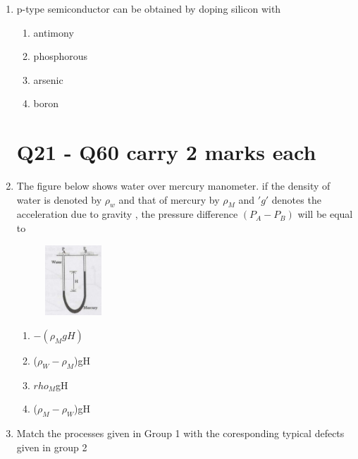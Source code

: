 \documentclass[journal]{IEEEtran}
\theoremstyle{remark}
\begin{document}
\begin{enumerate}
\item p-type semiconductor can be obtained by doping silicon with\hfill{}
\begin{multicols}{4}
\begin{enumerate}
\item antimony
\item phosphorous
\item arsenic
\item boron
\end{enumerate}
\end{multicols}

\section{Q21 - Q60 carry 2 marks each}
\item The figure below shows water over mercury manometer. if the density of water is denoted by $\rho_w$ and that of mercury by $\rho_M$ and $'g'$ denotes the acceleration due to gravity , the pressure difference $(P_A - P_B)$ will be equal to\hfill{}
\begin{figure}[H]
    \centering
    \includegraphics[width=0.2\textwidth]{figs/Q.21.png}
    \caption{}
    \label{fig:placeholder}
\end{figure}
\begin{multicols}{4}
\begin{enumerate}
    \item $-(\rho_M gH)$
    \item ($ \rho_W  -\rho_M$)gH
    \item  $rho_M$gH
    \item ($\rho_M-\rho_W$)gH
\end{enumerate}
\end{multicols}
\item Match the processes given in Group 1 with the coresponding typical defects given in group 2\hfill{}\\
\begin{center}
\begin{tabular}{c c}
 

\end{tabular}
\end{center}
\end{enumerate}
\end{document}
